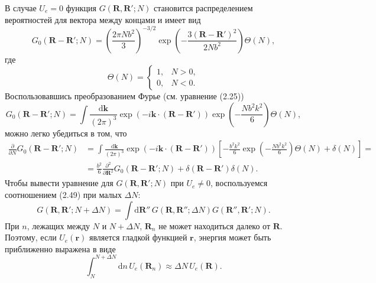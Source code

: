 \documentclass[12pt,a4paper]{article}
\begin{document}
В случае $U_e = 0$ функция $G(\boldsymbol{R}, \boldsymbol{R}'; N)$ становится распределением вероятностей для вектора между концами и имеет вид
\begin{equation}
G_0(\boldsymbol{R} - \boldsymbol{R}'; N) = \left(\frac{2\pi Nb^2}{3}\right)^{-3/2}\exp\left(-\frac{3(\boldsymbol{R} - \boldsymbol{R}')^2}{2Nb^2}\right)\Theta(N), \tag{2.II.1}
\end{equation}
где
\begin{equation}
\Theta(N) = \begin{cases} 1, & N > 0, \\ 0, & N < 0. \end{cases} \tag{2.II.2}
\end{equation}
Воспользовавшись преобразованием Фурье (см. уравнение (2.25))
\begin{equation}
G_0(\boldsymbol{R} - \boldsymbol{R}'; N) = \int\!\frac{\mathrm{d}\boldsymbol{k}}{(2\pi)^3}\exp(-i\boldsymbol{k}\cdot(\boldsymbol{R} - \boldsymbol{R}'))\exp\left(-\frac{Nb^2 k^2}{6}\right)\Theta(N), \tag{2.II.3}
\end{equation}
можно легко убедиться в том, что
\begin{align}
\frac{\partial}{\partial N}G_0(\boldsymbol{R} - \boldsymbol{R}'; N) &= \int\!\frac{\mathrm{d}\boldsymbol{k}}{(2\pi)^3}\exp(-i\boldsymbol{k}\cdot(\boldsymbol{R} - \boldsymbol{R}'))\left[-\frac{b^2 k^2}{6}\exp\left(-\frac{Nb^2 k^2}{6}\right)\Theta(N) + \delta(N)\right] = \nonumber\\
&= \frac{b^2}{6}\frac{\partial^2}{\partial\boldsymbol{R}^2}G_0(\boldsymbol{R} - \boldsymbol{R}'; N) + \delta(\boldsymbol{R} - \boldsymbol{R}')\delta(N). \tag{2.II.4}
\end{align}
Чтобы вывести уравнение для $G(\boldsymbol{R}, \boldsymbol{R}'; N)$ при $U_e \ne 0$, воспользуемся соотношением (2.49) при малых $\Delta N$:
\begin{equation}
G(\boldsymbol{R}, \boldsymbol{R}'; N + \Delta N) = \int\!\mathrm{d}\boldsymbol{R}''\,G(\boldsymbol{R}, \boldsymbol{R}''; \Delta N)G(\boldsymbol{R}'', \boldsymbol{R}'; N). \tag{2.II.5}
\end{equation}
При $n$, лежащих между $N$ и $N + \Delta N$, $\boldsymbol{R}_n$ не может находиться далеко от $\boldsymbol{R}$. Поэтому, если $U_e(\boldsymbol{r})$ является гладкой функцией $\boldsymbol{r}$, энергия может быть приближенно выражена в виде
\begin{equation}
\int_N^{N+\Delta N}\!\mathrm{d}n\,U_e(\boldsymbol{R}_n) \approx \Delta N\,U_e(\boldsymbol{R}). \tag{2.II.6}
\end{equation}
\end{document}
